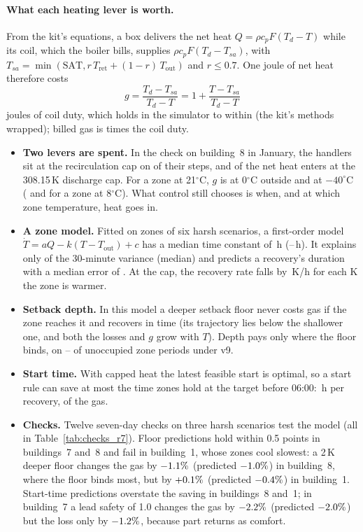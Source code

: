 \documentclass{article}
\begin{document}
\paragraph{What each heating lever is worth.}
From the kit's equations, a box delivers the net heat $Q=\rho c_p F (T_d - T)$ while its coil, which the boiler bills, supplies $\rho c_p F (T_d - T_{sa})$, with $T_{sa}=\min(\text{SAT}, r\,T_{\text{ret}} + (1-r)\,T_{\text{out}})$ and $r\le 0.7$. One joule of net heat therefore costs
\begin{equation}
g = \frac{T_d - T_{sa}}{T_d - T} = 1 + \frac{T - T_{sa}}{T_d - T}
\label{eq:g}
\end{equation}
joules of coil duty, which holds in the simulator to within \RSevGErr{} (the kit's methods wrapped); billed gas is \RSevGasOverCoil{} times the coil duty.
\begin{itemize}
\item \textbf{Two levers are spent.} In the check on building~8 in January, the handlers sit at the recirculation cap on \RSevRecircCapShare{} of their steps, and \RSevCapHeatShare{} of the net heat enters at the 308.15\,K discharge cap. For a zone at 21$^\circ$C, $g$ is \RSevGZero{} at 0$^\circ$C outside and \RSevGMinusForty{} at $-40^\circ$C (\RSevGColdZero{} and \RSevGColdMinusForty{} for a zone at 8$^\circ$C). What control still chooses is when, and at which zone temperature, heat goes in.
\item \textbf{A zone model.} Fitted on \RSevNZones{} zones of six harsh scenarios, a first-order model $\dot T = aQ - k(T - T_{\text{out}}) + c$ has a median time constant of \RSevTauMed\,h (\RSevTauLo--\RSevTauHi\,h). It explains only \RSevRTwo{} of the 30-minute variance (median) and predicts a recovery's duration with a median error of \RSevRecErr. At the cap, the recovery rate falls by \RSevRateSlope\,K/h for each K the zone is warmer.
\item \textbf{Setback depth.} In this model a deeper setback floor never costs gas if the zone reaches it and recovers in time (its trajectory lies below the shallower one, and both the losses and $g$ grow with $T$). Depth pays only where the floor binds, on \RSevBindLo--\RSevBindHi{} of unoccupied zone periods under v9.
\item \textbf{Start time.} With capped heat the latest feasible start is optimal, so a start rule can save at most the time zones hold at the target before 06:00: \RSevHoldH\,h per recovery, \RSevHoldGas{} of the gas.
\item \textbf{Checks.} Twelve seven-day checks on three harsh scenarios test the model (all in Table~\ref{tab:checks_r7}). Floor predictions hold within 0.5 points in buildings~7 and~8 and fail in building~1, whose zones cool slowest: a 2\,K deeper floor changes the gas by $-1.1\%$ (predicted $-1.0\%$) in building~8, where the floor binds most, but by $+0.1\%$ (predicted $-0.4\%$) in building~1. Start-time predictions overstate the saving in buildings~8 and~1; in building~7 a lead safety of 1.0 changes the gas by $-2.2\%$ (predicted $-2.0\%$) but the loss only by $-1.2\%$, because part returns as comfort.
\end{itemize}
\end{document}
